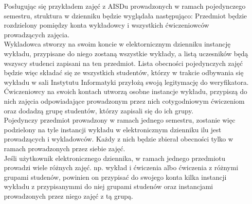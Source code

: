 \documentclass[declaration,shortabstract, mgr]{iithesis}
\begin{document}
\indent Posługując się przykładem zajęć z AISDu prowadzonych w ramach pojedynczego semestru, struktura w dzienniku będzie wyglądała następująco:
\indent Przedmiot będzie rozdzielony pomiędzy konta wykładowcy i wszystkich ćwiczeniowców prowadzących zajęcia. \\
\indent Wykladowca stworzy na swoim koncie w elektornicznym dzienniku instancję wykładu, przypisane do niego zostaną wszystkie wykłady, a listą uczesników będą wszyscy studenci zapisani na ten przedmiot. Lista obecności pojedynczych zajęć będzie więc składać się ze wszystkich studentów, którzy w trakcie odbywania się wykładu w sali Instytutu Informatyki przyłożą swoją legitymację do weryfikatora.\\
\indent Ćwiczeniowcy na swoich kontach utworzą osobne instancje wykładu, przypiszą do nich zajęcia odpowiadające prowadzonym przez nich cotygodniowym ćwiczeniom oraz dodadzą grupę studentów, którzy zapisali się do ich grupy. \\
\indent Pojedynczy przedmiot prowadzony w ramach jednego semestru, zostanie więc podzielony na tyle instancji wykładu w elektronicznym dzienniku ilu jest prowadzących i wykladowców. Każdy z nich będzie zbierał obecności tylko w ramach prowadzonych przez siebie zajęć. \\
\indent Jeśli użytkownik elektronicznego dziennika, w ramach jednego przedmiotu prowadzi wiele różnych zajęć. np. wykład i ćwiczenia albo ćwiczenia z różnymi grupami studenów, powinien on przypisać do swojego konta kilka instancji wykładu z przypisanymmi do niej grupami studenów oraz instancjami prowadzonych przez niego zajęć z tą grupą.
\end{document}
